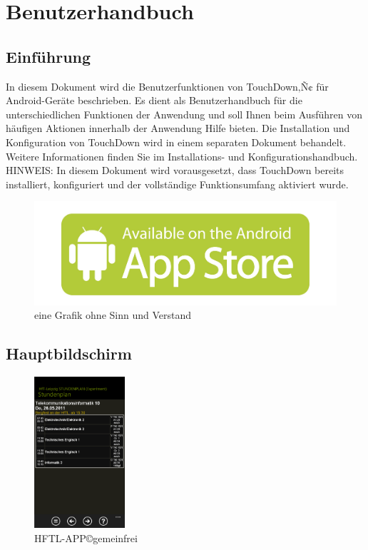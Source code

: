 \section{Benutzerhandbuch}
\subsection{Einführung}
In diesem Dokument wird die Benutzerfunktionen von TouchDown‚Ñ¢ für
Android-Geräte beschrieben. Es dient als Benutzerhandbuch für die
unterschiedlichen Funktionen der Anwendung und soll Ihnen beim
Ausführen von häufigen Aktionen innerhalb der Anwendung Hilfe bieten.
Die Installation und Konfiguration von TouchDown wird in einem
separaten Dokument behandelt. Weitere Informationen finden Sie im
Installations- und Konfigurationshandbuch.
HINWEIS: In diesem Dokument wird vorausgesetzt, dass TouchDown
bereits installiert, konfiguriert und der vollständige Funktionsumfang
aktiviert wurde.
\begin{figure}[h]
	\centering
	\includegraphics[scale=0.5]{03_Bedienungsanleitung/img/appstore.jpg}
	\caption{eine Grafik ohne Sinn und Verstand}
	\label{img:grafik-dummy}
\end{figure}

\subsection{Hauptbildschirm}

\begin{figure}
  \begin{center}
    \includegraphics[width=0.3\textwidth]{03_Bedienungsanleitung/img/hftlapp.png}
  \end{center}
  \caption{HFTL-APP©gemeinfrei}
  \label{reaper}
\end{figure}

